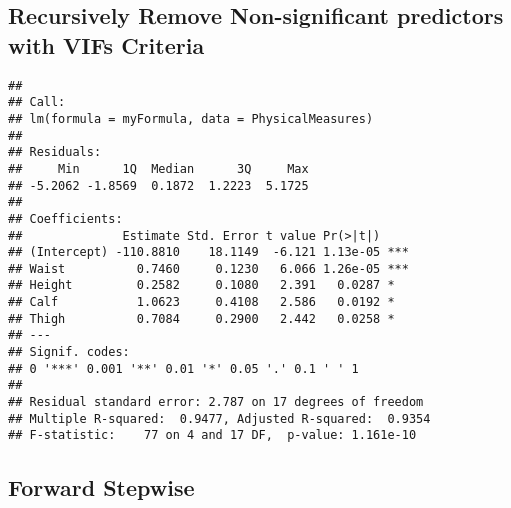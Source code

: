 \documentclass[]{article}
\newenvironment{Shaded}{\begin{snugshade}}{\end{snugshade}}
\newcommand{\KeywordTok}[1]{\textcolor[rgb]{0.13,0.29,0.53}{\textbf{#1}}}
\newcommand{\DataTypeTok}[1]{\textcolor[rgb]{0.13,0.29,0.53}{#1}}
\newcommand{\DecValTok}[1]{\textcolor[rgb]{0.00,0.00,0.81}{#1}}
\newcommand{\StringTok}[1]{\textcolor[rgb]{0.31,0.60,0.02}{#1}}
\newcommand{\CommentTok}[1]{\textcolor[rgb]{0.56,0.35,0.01}{\textit{#1}}}
\newcommand{\OtherTok}[1]{\textcolor[rgb]{0.56,0.35,0.01}{#1}}
\newcommand{\OperatorTok}[1]{\textcolor[rgb]{0.81,0.36,0.00}{\textbf{#1}}}
\newcommand{\NormalTok}[1]{#1}
\begin{document}
\subsection{Recursively Remove Non-significant predictors with VIFs
Criteria}\label{recursively-remove-non-significant-predictors-with-vifs-criteria-1}

\begin{verbatim}
## 
## Call:
## lm(formula = myFormula, data = PhysicalMeasures)
## 
## Residuals:
##     Min      1Q  Median      3Q     Max 
## -5.2062 -1.8569  0.1872  1.2223  5.1725 
## 
## Coefficients:
##              Estimate Std. Error t value Pr(>|t|)    
## (Intercept) -110.8810    18.1149  -6.121 1.13e-05 ***
## Waist          0.7460     0.1230   6.066 1.26e-05 ***
## Height         0.2582     0.1080   2.391   0.0287 *  
## Calf           1.0623     0.4108   2.586   0.0192 *  
## Thigh          0.7084     0.2900   2.442   0.0258 *  
## ---
## Signif. codes:  
## 0 '***' 0.001 '**' 0.01 '*' 0.05 '.' 0.1 ' ' 1
## 
## Residual standard error: 2.787 on 17 degrees of freedom
## Multiple R-squared:  0.9477, Adjusted R-squared:  0.9354 
## F-statistic:    77 on 4 and 17 DF,  p-value: 1.161e-10
\end{verbatim}

\subsection{Forward Stepwise}\label{forward-stepwise}

\begin{Shaded}
\end{Shaded}
\end{document}
